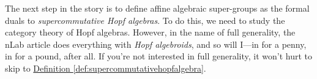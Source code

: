 \documentclass[a4paper,10pt]{scrreprt}
\newcommand{\R}{\mathbb{R}}
\theoremstyle{definition}
\theoremstyle{plain}
\theoremstyle{remark}
\begin{document}
%
%

The next step in the story is to define affine algebraic super-groups as the formal duals to \emph{supercommutative Hopf algebras}. To do this, we need to study the category theory of Hopf algebras. However, in the name of full generality, the nLab article \cite{nlab-deligne-theorem} does everything with \emph{Hopf algebroids}, and so will I---in for a penny, in for a pound, after all. If you're not interested in full generality, it won't hurt to skip to \hyperref[def:supercommutativehopfalgebra]{Definition \ref*{def:supercommutativehopfalgebra}}.
\end{document}

